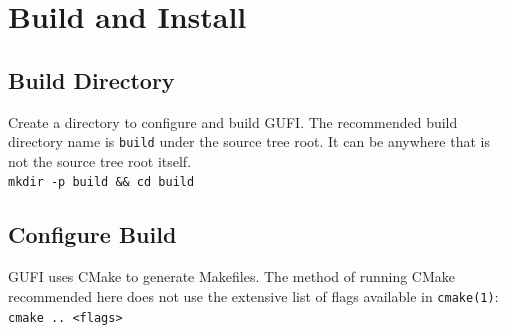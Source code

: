 \section{Build and Install}
\subsection{Build Directory}
Create a directory to configure and build GUFI. The recommended build
directory name is \texttt{build} under the source tree root. It can be
anywhere that is not the source tree root itself. \\

\texttt{mkdir -p build \&\& cd build}

\subsection{Configure Build}
GUFI uses CMake to generate Makefiles. The method of running CMake
recommended here does not use the extensive list of flags available in
\texttt{cmake(1)}: \\

\texttt{cmake .. <flags>} \\

